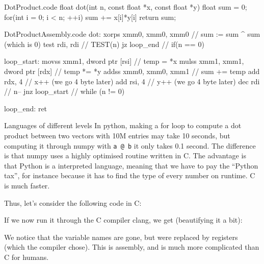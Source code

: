 \documentclass[a4paper]{article}
\begin{document}
\begin{filecontents*}[overwrite]{DotProduct.code}
float dot(int n, const float *x, const float *y) {
    float sum = 0;
    for(int i = 0; i < n; ++i)
        sum += x[i]*y[i]
    return sum;
}
\end{filecontents*}

\begin{filecontents*}[overwrite]{DotProductAssembly.code}
dot:
    xorps xmm0, xmm0, xmm0  // sum := sum ^ sum (which is 0)
    test rdi, rdi  // TEST(n)
    jz loop_end  // if(n == 0)

loop_start:
    movss xmm1, dword ptr [rsi]  // temp = *x
    mulss xmm1, xmm1, dword ptr [rdx]  // temp *= *y
    addss xmm0, xmm0, xmm1  // sum += temp
    add rdx, 4  // x++ (we go 4 byte later)
    add rsi, 4  // y++ (we go 4 byte later)
    dec rdi  // n--
    jnz loop_start  // while (n != 0)

loop_end:
    ret
\end{filecontents*}


\begin{parag}{Languages of different levels}
    In python, making a for loop to compute a dot product between two vectors with 10M entries may take 10 seconds, but computing it through numpy with \texttt{a @ b} it only takes 0.1 second. The difference is that numpy uses a highly optimised routine written in C. The advantage is that Python is a interpreted language, meaning that we have to pay the ``Python tax'', for instance because it has to find the type of every number on runtime. C is much faster.

    Thus, let's consider the following code in C:
    
    If we now run it through the C compiler clang, we get (beautifying it a bit):
    
    We notice that the variable names are gone, but were replaced by registers (which the compiler chose). This is assembly, and is much more complicated than C for humans.
\end{parag}
\end{document}
